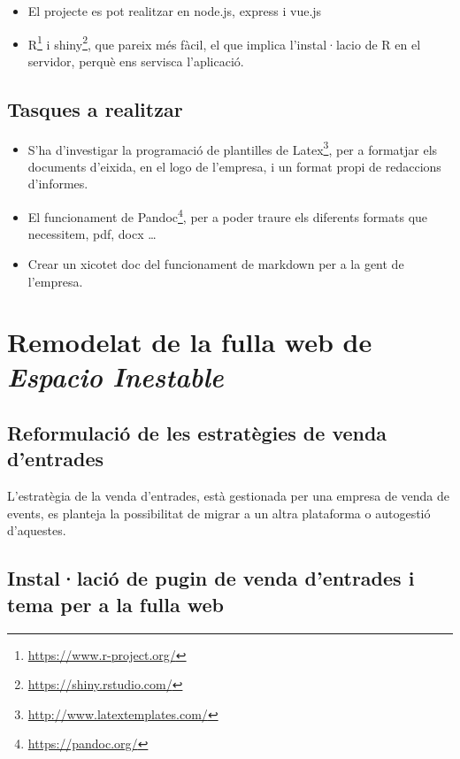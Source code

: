 \documentclass[
  10pt,
]{krantz}
\DeclareRobustCommand{\href}[2]{#2\footnote{\url{#1}}}
\providecommand{\tightlist}{%
  \setlength{\itemsep}{0pt}\setlength{\parskip}{0pt}}
\begin{document}
\begin{itemize}
\tightlist
\item
  El projecte es pot realitzar en node.js, express i vue.js
\item
  \href{https://www.r-project.org/}{R} i \href{https://shiny.rstudio.com/}{shiny}, que pareix més fàcil, el que implica l'instal·lacio de R en el servidor, perquè ens servisca l'aplicació.
\end{itemize}

\hypertarget{tasques-a-realitzar}{%
\section{Tasques a realitzar}\label{tasques-a-realitzar}}

\begin{itemize}
\tightlist
\item
  S'ha d'investigar la programació de plantilles de \href{http://www.latextemplates.com/}{Latex}, per a formatjar els documents d'eixida, en el logo de l'empresa, i un format propi de redaccions d'informes.
\item
  El funcionament de \href{https://pandoc.org/}{Pandoc}, per a poder traure els diferents formats que necessitem, pdf, docx \ldots{}
\item
  Crear un xicotet doc del funcionament de markdown per a la gent de l'empresa.
\end{itemize}

\hypertarget{remodelat-de-la-fulla-web-de-espacio-inestable}{%
\chapter{\texorpdfstring{Remodelat de la fulla web de \emph{Espacio Inestable}}{Remodelat de la fulla web de Espacio Inestable}}\label{remodelat-de-la-fulla-web-de-espacio-inestable}}

\hypertarget{reformulaciuxf3-de-les-estratuxe8gies-de-venda-dentrades}{%
\section{Reformulació de les estratègies de venda d'entrades}\label{reformulaciuxf3-de-les-estratuxe8gies-de-venda-dentrades}}

L'estratègia de la venda d'entrades, està gestionada per una empresa de venda de events, es planteja la possibilitat de migrar a un altra plataforma o autogestió d'aquestes.

\hypertarget{installaciuxf3-de-pugin-de-venda-dentrades-i-tema-per-a-la-fulla-web}{%
\section{Instal·lació de pugin de venda d'entrades i tema per a la fulla web}\label{installaciuxf3-de-pugin-de-venda-dentrades-i-tema-per-a-la-fulla-web}}
\end{document}

